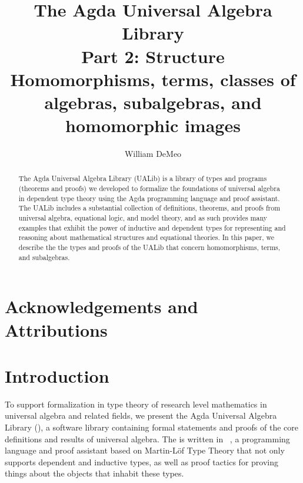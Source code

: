 \documentclass[a4paper,UKenglish,cleveref,autoref,thm-restate,12pt]{../lipics-v2021-wjd}
\title{The Agda Universal Algebra Library\\%
Part 2: Structure\\[-5pt]
{\large Homomorphisms, terms, classes of algebras, subalgebras, and homomorphic images}}
\author{William DeMeo}
       {Department of Algebra, Charles University in Prague \and \url{https://williamdemeo.gitlab.io}}
       {williamdemeo@gmail.com}{https://orcid.org/0000-0003-1832-5690}{}
\begin{document}
\maketitle


\begin{abstract}
The Agda Universal Algebra Library (UALib) is a library of types and programs (theorems and proofs) we developed to formalize the foundations of universal algebra in dependent type theory using the Agda programming language and proof assistant. 
 The UALib includes a substantial collection of definitions, theorems, and proofs from universal algebra, equational logic, and model theory, and as such provides many examples that exhibit the power of inductive and dependent types for representing and reasoning about mathematical structures and equational theories. In this paper, we describe the the types and proofs of the UALib that concern homomorphisms, terms, and subalgebras.
\end{abstract}

\section*{Acknowledgements and Attributions}


\newpage

\setcounter{tocdepth}{2}
\tableofcontents


\section{Introduction}\label{sec:introduction}
To support formalization in type theory of research level mathematics in universal algebra and related fields, we present the Agda Universal Algebra Library (\agdaualib), a software library containing formal statements and proofs of the core definitions and results of universal algebra. 
The \ualib is written in \agda~\cite{Norell:2009}, a programming language and proof assistant based on Martin-L\"of Type Theory that not only supports dependent and inductive types, as well as proof tactics for proving things about the objects that inhabit these types.
\end{document}
